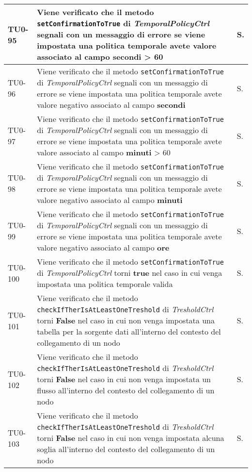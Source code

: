 \begin{longtable}{|C{.15\textwidth}|m{.66\textwidth}|C{.10\textwidth}|}
\hline
{}TU0-95 & Viene verificato che il metodo \texttt{setConfirmationToTrue} di \textit{TemporalPolicyCtrl} segnali con un messaggio di errore se viene impostata una politica temporale avete valore associato al campo \textbf{secondi} > 60 & S.\\
\hline
TU0-96 & Viene verificato che il metodo \texttt{setConfirmationToTrue} di \textit{TemporalPolicyCtrl} segnali con un messaggio di errore se viene impostata una politica temporale avete valore negativo associato al campo \textbf{secondi} & S.\\
\hline
{}TU0-97 & Viene verificato che il metodo \texttt{setConfirmationToTrue} di \textit{TemporalPolicyCtrl} segnali con un messaggio di errore se viene impostata una politica temporale avete valore associato al campo \textbf{minuti} > 60 & S.\\
\hline
TU0-98 & Viene verificato che il metodo \texttt{setConfirmationToTrue} di \textit{TemporalPolicyCtrl} segnali con un messaggio di errore se viene impostata una politica temporale avete valore negativo associato al campo \textbf{minuti} & S.\\
\hline
{}TU0-99 & Viene verificato che il metodo \texttt{setConfirmationToTrue} di \textit{TemporalPolicyCtrl} segnali con un messaggio di errore se viene impostata una politica temporale avete valore negativo associato al campo \textbf{ore} & S.\\
\hline
TU0-100 & Viene verificato che il metodo \texttt{setConfirmationToTrue} di \textit{TemporalPolicyCtrl} torni \textbf{true} nel caso in cui venga impostata una politica temporale valida & S.\\
\hline
{}TU0-101 & Viene verificato che il metodo \texttt{checkIfTherIsAtLeastOneTreshold} di \textit{TresholdCtrl} torni \textbf{False} nel caso in cui non venga impostata una tabella per la sorgente dati all'interno del contesto del collegamento di un nodo & S.\\
\hline
TU0-102 & Viene verificato che il metodo \texttt{checkIfTherIsAtLeastOneTreshold} di \textit{TresholdCtrl} torni \textbf{False} nel caso in cui non venga impostata un flusso all'interno del contesto del collegamento di un nodo & S.\\
\hline
{}TU0-103 & Viene verificato che il metodo \texttt{checkIfTherIsAtLeastOneTreshold} di \textit{TresholdCtrl} torni \textbf{False} nel caso in cui non venga impostata alcuna soglia all'interno del contesto del collegamento di un nodo & S.\\

\end{longtable}
